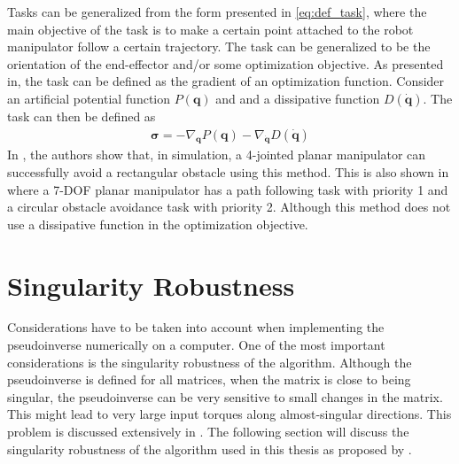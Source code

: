 Tasks can be generalized from the form presented in \autoref{eq:def_task}, where
the main objective of the task is to make a certain point attached to the robot
manipulator follow a certain trajectory. The task can be generalized to be the
orientation of the end-effector and/or some optimization objective. As presented
in\cite{nakamura1987}, the task can be defined as the gradient of an optimization
function. Consider an artificial potential function $P(\bm{q})$ and and a dissipative function
$D(\dot{\bm{q}})$. The task can then be defined as
\begin{align}
    \bm{\sigma} = -\nabla_{\bm{q}} P(\bm{q}) - \nabla_{\dot{\bm{q}}}D(\dot{\bm{q}})
\end{align}
In \cite{nakamura1987}, the authors show that, in simulation, a 4-jointed planar
manipulator can successfully avoid a rectangular obstacle using this method. This is
also shown in \cite{siciliano1991} where a 7-DOF planar manipulator has a path
following task with priority 1 and a circular obstacle avoidance task with priority 2.
Although this method does not use a dissipative function in the optimization objective.




\section{Singularity Robustness}
\label{sec:tpc:sing_robust}

Considerations have to be taken into account when implementing the
pseudoinverse numerically on a computer. One of the most important considerations is the singularity
robustness of the algorithm. Although the pseudoinverse is defined for all matrices,
when the matrix is close to being singular, the pseudoinverse can be very sensitive
to small changes in the matrix. This might lead to very large input torques along
almost-singular directions. This problem is discussed extensively in \cite{chiaverini1997}.
The following section will discuss the singularity robustness of the algorithm used in this
thesis as proposed by \cite{chiaverini1997}.

